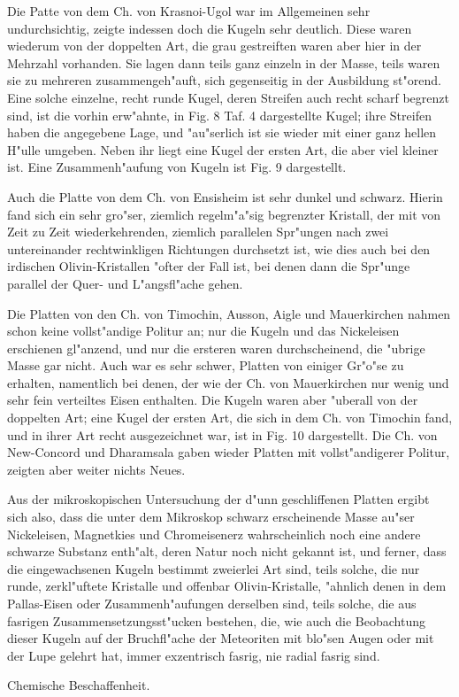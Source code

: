 \documentclass[a4paper, 11pt, oneside]{article}
\begin{document}
Die Patte von dem Ch. von Krasnoi-Ugol war im Allgemeinen sehr undurchsichtig, zeigte indessen doch die Kugeln sehr deutlich. Diese waren wiederum von der doppelten Art, die grau gestreiften waren aber hier in der Mehrzahl vorhanden. Sie lagen dann teils ganz einzeln in der Masse, teils waren sie zu mehreren zusammengeh"auft, sich gegenseitig in der Ausbildung st"orend. Eine solche einzelne, recht runde Kugel, deren Streifen auch recht scharf begrenzt sind, ist die vorhin erw"ahnte, in Fig. 8 Taf. 4 dargestellte Kugel; ihre Streifen haben die angegebene Lage, und "au"serlich ist sie wieder mit einer ganz hellen H"ulle umgeben. Neben ihr liegt eine Kugel der ersten Art, die aber viel kleiner ist. Eine Zusammenh"aufung von Kugeln ist Fig. 9 dargestellt.

Auch die Platte von dem Ch. von Ensisheim ist sehr dunkel und schwarz. Hierin fand sich ein sehr gro"ser, ziemlich regelm"a"sig begrenzter Kristall, der mit von Zeit zu Zeit wiederkehrenden, ziemlich parallelen Spr"ungen nach zwei untereinander rechtwinkligen Richtungen durchsetzt ist, wie dies auch bei den irdischen Olivin-Kristallen "ofter der Fall ist, bei denen dann die Spr"unge parallel der Quer- und L"angsfl"ache gehen.

Die Platten von den Ch. von Timochin, Ausson, Aigle und Mauerkirchen nahmen schon keine vollst"andige Politur an; nur die Kugeln und das Nickeleisen erschienen gl"anzend, und nur die ersteren waren durchscheinend, die "ubrige Masse gar nicht. Auch war es sehr schwer, Platten von einiger Gr"o"se zu erhalten, namentlich bei denen, der wie der Ch. von Mauerkirchen nur wenig und sehr fein verteiltes Eisen enthalten. Die Kugeln waren aber "uberall von der doppelten Art; eine Kugel der ersten Art, die sich in dem Ch. von Timochin fand, und in ihrer Art recht ausgezeichnet war, ist in Fig. 10 dargestellt. Die Ch. von New-Concord und Dharamsala gaben wieder Platten mit vollst"andigerer Politur, zeigten aber weiter nichts Neues.

Aus der mikroskopischen Untersuchung der d"unn geschliffenen Platten ergibt sich also, dass die unter dem Mikroskop schwarz erscheinende Masse au"ser Nickeleisen, Magnetkies und Chromeisenerz wahrscheinlich noch eine andere schwarze Substanz enth"alt, deren Natur noch nicht gekannt ist, und ferner, dass die eingewachsenen Kugeln bestimmt zweierlei Art sind, teils solche, die nur runde, zerkl"uftete Kristalle und offenbar Olivin-Kristalle, "ahnlich denen in dem Pallas-Eisen oder Zusammenh"aufungen derselben sind, teils solche, die aus fasrigen Zusammensetzungsst"ucken bestehen, die, wie auch die Beobachtung dieser Kugeln auf der Bruchfl"ache der Meteoriten mit blo"sen Augen oder mit der Lupe gelehrt hat, immer exzentrisch fasrig, nie radial fasrig sind.
\begin{center}
Chemische Beschaffenheit.
\end{center}
\end{document}
